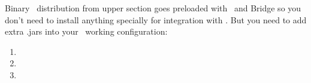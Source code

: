 
Binary \flora\ distribution from upper section goes preloaded with \xsb\ and
\java Bridge so you don't need to install anything specially for integration
with \seco. But you need to add extra .jars into your \seco\ working
configuration:

\bigskip
\begin{enumerate}[nosep]
  \item {}
  \item {}
  \item {}
\end{enumerate}




\secup
